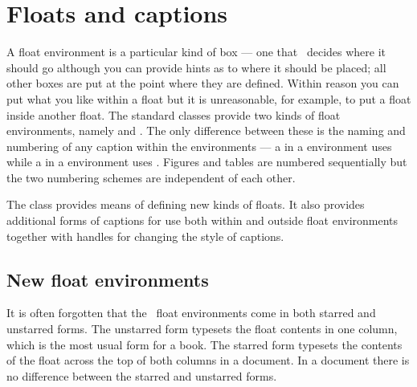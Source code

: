 
 \chapter{Floats and captions} \label{chap:captions}


    A float environment is a particular kind of 
box  --- one that \ltx\ decides where it should go although
you can provide hints as to where it should be placed; 
all other boxes are put at the point where they are defined. 
Within reason you can put what you like within a float but it is 
unreasonable, for example, to put a float inside 
another float. The standard classes provide two kinds of float 
environments, namely  and . The only difference
between these is the naming and numbering of any caption 
within the environments --- a \cmd{\caption} in a  
environment uses \cmd{\figurename} while a \cmd{\caption} in a 
 environment uses \cmd{\tablename}. Figures and tables are 
numbered sequentially but the two numbering schemes are independent 
of each other.

    The class provides means of defining new kinds of floats. It also
provides additional forms of captions for use both within and outside 
float environments together with handles for changing the style 
of captions.

\section{New float environments} \label{sec:newfloat}

    It is often forgotten that the \ltx\ float environments come
in both starred and unstarred forms. The unstarred form typesets the 
float contents in one column, which is 
the most usual form for a book. The starred form typesets the contents 
of the float across the top of both columns 
in a  document. In a  document there 
is no difference between the starred and unstarred forms.


